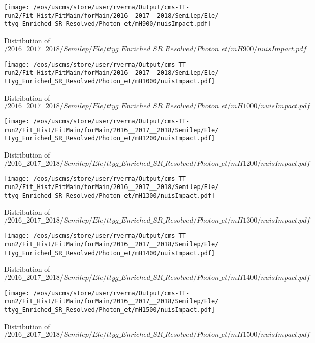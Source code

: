 \begin{figure}
\centering
\texttt{[image: /eos/uscms/store/user/rverma/Output/cms-TT-run2/Fit\_Hist/FitMain/forMain/2016\_\_2017\_\_2018/Semilep/Ele/ttyg\_Enriched\_SR\_Resolved/Photon\_et/mH900/nuisImpact.pdf]}
\caption{Distribution of $/2016\_\_2017\_\_2018/Semilep/Ele/ttyg\_Enriched\_SR\_Resolved/Photon\_et/mH900/nuisImpact.pdf$}
\end{figure}

\begin{figure}
\centering
\texttt{[image: /eos/uscms/store/user/rverma/Output/cms-TT-run2/Fit\_Hist/FitMain/forMain/2016\_\_2017\_\_2018/Semilep/Ele/ttyg\_Enriched\_SR\_Resolved/Photon\_et/mH1000/nuisImpact.pdf]}
\caption{Distribution of $/2016\_\_2017\_\_2018/Semilep/Ele/ttyg\_Enriched\_SR\_Resolved/Photon\_et/mH1000/nuisImpact.pdf$}
\end{figure}

\begin{figure}
\centering
\texttt{[image: /eos/uscms/store/user/rverma/Output/cms-TT-run2/Fit\_Hist/FitMain/forMain/2016\_\_2017\_\_2018/Semilep/Ele/ttyg\_Enriched\_SR\_Resolved/Photon\_et/mH1200/nuisImpact.pdf]}
\caption{Distribution of $/2016\_\_2017\_\_2018/Semilep/Ele/ttyg\_Enriched\_SR\_Resolved/Photon\_et/mH1200/nuisImpact.pdf$}
\end{figure}

\begin{figure}
\centering
\texttt{[image: /eos/uscms/store/user/rverma/Output/cms-TT-run2/Fit\_Hist/FitMain/forMain/2016\_\_2017\_\_2018/Semilep/Ele/ttyg\_Enriched\_SR\_Resolved/Photon\_et/mH1300/nuisImpact.pdf]}
\caption{Distribution of $/2016\_\_2017\_\_2018/Semilep/Ele/ttyg\_Enriched\_SR\_Resolved/Photon\_et/mH1300/nuisImpact.pdf$}
\end{figure}

\begin{figure}
\centering
\texttt{[image: /eos/uscms/store/user/rverma/Output/cms-TT-run2/Fit\_Hist/FitMain/forMain/2016\_\_2017\_\_2018/Semilep/Ele/ttyg\_Enriched\_SR\_Resolved/Photon\_et/mH1400/nuisImpact.pdf]}
\caption{Distribution of $/2016\_\_2017\_\_2018/Semilep/Ele/ttyg\_Enriched\_SR\_Resolved/Photon\_et/mH1400/nuisImpact.pdf$}
\end{figure}

\begin{figure}
\centering
\texttt{[image: /eos/uscms/store/user/rverma/Output/cms-TT-run2/Fit\_Hist/FitMain/forMain/2016\_\_2017\_\_2018/Semilep/Ele/ttyg\_Enriched\_SR\_Resolved/Photon\_et/mH1500/nuisImpact.pdf]}
\caption{Distribution of $/2016\_\_2017\_\_2018/Semilep/Ele/ttyg\_Enriched\_SR\_Resolved/Photon\_et/mH1500/nuisImpact.pdf$}
\end{figure}

